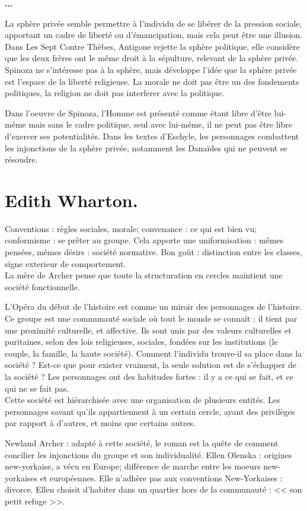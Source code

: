 \documentclass[11pt]{article}
\begin{document}
\bf{...}

La sphère privée semble permettre à l'individu de se libérer de la pression sociale, apportant un cadre de liberté ou d'émancipation, mais cela peut être une illusion.
Dans Les Sept Contre Thèbes, Antigone rejette la sphère politique, elle considère que les deux frères ont le même droit à la sépulture, relevant de la sphère privée. 
Spinoza ne s'intéresse pas à la sphère, mais développe l'idée que la sphère privée est l'espace de la liberté religieuse. 
La morale ne doit pas être un des fondements politiques, la religion ne doit pas interferer avec la politique.

Dans l'oeuvre de Spinoza, l'Homme est présenté comme étant libre d'être lui-même mais sans le cadre politique, seul avec lui-même, il ne peut pas être libre d'exercer ses potentialités. Dans les textes d'Eschyle, les personnages combattent les injonctions de la sphère privée, notamment les Danaïdes qui ne peuvent se résoudre.

\section{Edith Wharton.}

Conventions : règles sociales, morale; convenance : ce qui est bien vu; conformisme : se prêter au groupe. Cela apporte une uniformisation : mêmes pensées, mêmes désirs : société normative.
Bon goût : distinction entre les classes, signe exterieur de comportement.\\
La mère de Archer pense que toute la structuration en cercles maintient une société fonctionnelle.

L'Opéra du début de l'histoire est comme un miroir des personnages de l'histoire. Ce groupe est une communauté sociale où tout le monde se connaît : il tient par une proximité culturelle, et affective. Ils sont unis par des valeurs culturelles et puritaines, selon des lois religieuses, sociales, fondées sur les institutions (le couple, la famille, la haute société). Comment l'individu trouve-il sa place dans la société ? Est-ce que pour exister vraiment, la seule solution est de s'échapper de la société ? Les personnages ont des habitudes fortes : il y a ce qui se fait, et ce qui ne se fait pas.\\
Cette société est hiérarchisée avec une organisation de plusieurs entités. Les personnages savant qu'ils appartiennent à un certain cercle, ayant des privilèges par rapport à d'autres, et moins que certains autres.

Newland Archer : adapté à cette société, le roman est la quête de comment concilier les injonctions du groupe et son individualité.
Ellen Olenska : origines new-yorkaise, a vécu en Europe; différence de marche entre les moeurs new-yorkaises et européennes. Elle n'adhère pas aux conventions New-Yorkaises : divorce. Ellen choisit d'habiter dans un quartier hors de la communauté : << son petit refuge >>.
\end{document}
